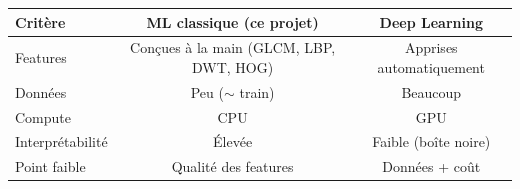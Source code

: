 \begin{table}
\centering
\small
\begin{tabular}{@{}lcc@{}}
\toprule
\textbf{Critère} & \textbf{ML classique (ce projet)} & \textbf{Deep Learning} \\
\midrule
Features       & Conçues à la main (GLCM, LBP, DWT, HOG) & Apprises automatiquement \\
Données        & Peu ($\sim$\NTrain{} train)             & Beaucoup \\
Compute        & CPU                                     & GPU \\
Interprétabilité & Élevée                                & Faible (boîte noire) \\
Point faible   & Qualité des features                    & Données + coût \\
\bottomrule
\end{tabular}
\end{table}
